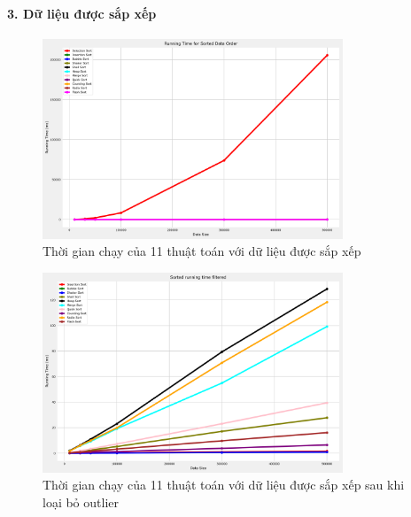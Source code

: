 \paragraph{3. Dữ liệu được sắp xếp}
\begin{figure}[H]
    \centering
    \includegraphics[width=0.8\textwidth]{exprimental_result/images/sorted_running_time.png}
    \caption{Thời gian chạy của 11 thuật toán với dữ liệu được sắp xếp}
\end{figure}

\begin{figure}[H]
    \centering
    \includegraphics[width=0.8\textwidth]{exprimental_result/images/sorted_running_time_filtered.png}
    \caption{Thời gian chạy của 11 thuật toán với dữ liệu được sắp xếp sau khi loại bỏ outlier}
\end{figure}





